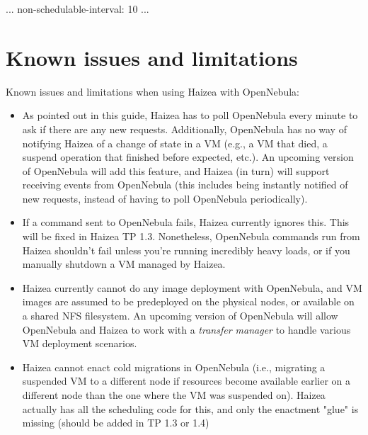 \begin{wideshellverbatim}
[opennebula]
...
non-schedulable-interval: 10
...
\end{wideshellverbatim}

\section{Known issues and limitations}

Known issues and limitations when using Haizea with OpenNebula:

\begin{itemize}
\item As pointed out in this guide, Haizea has to poll OpenNebula every minute to ask if there are any new requests. Additionally, OpenNebula has no way of notifying Haizea of a change of state in a VM (e.g., a VM that died, a suspend operation that finished before expected, etc.). An upcoming version of OpenNebula will add this feature, and Haizea (in turn) will support receiving events from OpenNebula (this includes being instantly notified of new requests, instead of having to poll OpenNebula periodically).
\item If a command sent to OpenNebula fails, Haizea currently ignores this. This will be fixed in Haizea TP 1.3. Nonetheless, OpenNebula commands run from Haizea shouldn't fail unless you're running incredibly heavy loads, or if you manually shutdown a VM managed by Haizea.
\item Haizea currently cannot do any image deployment with OpenNebula, and VM images are assumed to be predeployed on the physical nodes, or available on a shared NFS filesystem. An upcoming version of OpenNebula will allow OpenNebula and Haizea to work with a \emph{transfer manager} to handle various VM deployment scenarios.
\item Haizea cannot enact cold migrations in OpenNebula (i.e., migrating a suspended VM to a different node if resources become available earlier on a different node than the one where the VM was suspended on). Haizea actually has all the scheduling code for this, and only the enactment "glue" is missing (should be added in TP 1.3 or 1.4)
\end{itemize}